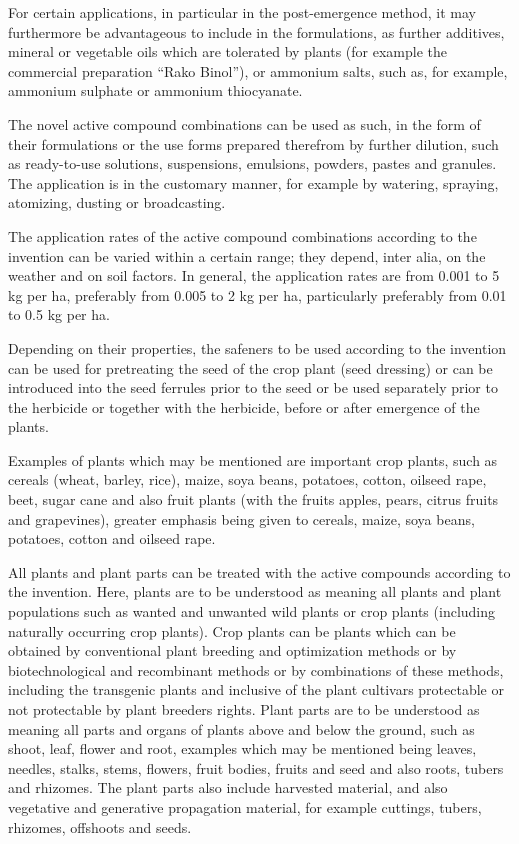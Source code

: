 \documentclass[11pt,a4paper]{article}
\begin{document}
For certain applications, in particular in the post-emergence method, it may furthermore be advantageous to include in the formulations, as further additives, mineral or vegetable oils which are tolerated by plants (for example the commercial preparation “Rako Binol”), or ammonium salts, such as, for example, ammonium sulphate or ammonium thiocyanate.

The novel active compound combinations can be used as such, in the form of their formulations or the use forms prepared therefrom by further dilution, such as ready-to-use solutions, suspensions, emulsions, powders, pastes and granules. The application is in the customary manner, for example by watering, spraying, atomizing, dusting or broadcasting.

The application rates of the active compound combinations according to the invention can be varied within a certain range; they depend, inter alia, on the weather and on soil factors. In general, the application rates are from 0.001 to 5 kg per ha, preferably from 0.005 to 2 kg per ha, particularly preferably from 0.01 to 0.5 kg per ha.

Depending on their properties, the safeners to be used according to the invention can be used for pretreating the seed of the crop plant (seed dressing) or can be introduced into the seed ferrules prior to the seed or be used separately prior to the herbicide or together with the herbicide, before or after emergence of the plants.

Examples of plants which may be mentioned are important crop plants, such as cereals (wheat, barley, rice), maize, soya beans, potatoes, cotton, oilseed rape, beet, sugar cane and also fruit plants (with the fruits apples, pears, citrus fruits and grapevines), greater emphasis being given to cereals, maize, soya beans, potatoes, cotton and oilseed rape.

All plants and plant parts can be treated with the active compounds according to the invention. Here, plants are to be understood as meaning all plants and plant populations such as wanted and unwanted wild plants or crop plants (including naturally occurring crop plants). Crop plants can be plants which can be obtained by conventional plant breeding and optimization methods or by biotechnological and recombinant methods or by combinations of these methods, including the transgenic plants and inclusive of the plant cultivars protectable or not protectable by plant breeders rights. Plant parts are to be understood as meaning all parts and organs of plants above and below the ground, such as shoot, leaf, flower and root, examples which may be mentioned being leaves, needles, stalks, stems, flowers, fruit bodies, fruits and seed and also roots, tubers and rhizomes. The plant parts also include harvested material, and also vegetative and generative propagation material, for example cuttings, tubers, rhizomes, offshoots and seeds.
\end{document}
